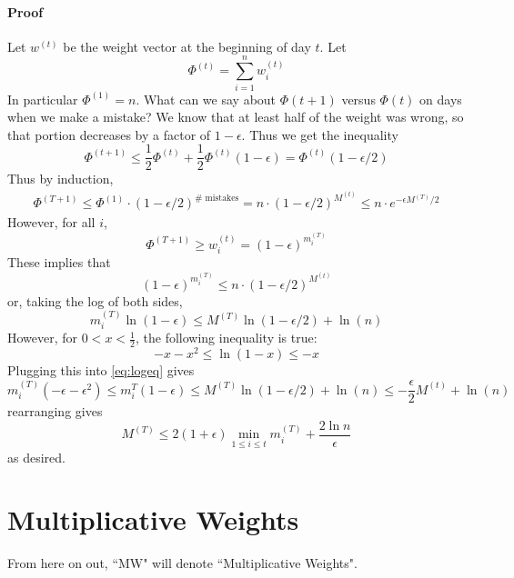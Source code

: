 \documentclass[11pt]{article}
\begin{document}
\paragraph{Proof} Let $w^{(t)}$ be the weight vector at the beginning of day $t$. Let 
\begin{equation}
\Phi^{(t)} = \sum_{i=1}^n w_i^{(t)}
\end{equation}
In particular $\Phi^{(1)} = n$. What can we say about $\Phi(t+1)$ versus $\Phi(t)$ on days when we make a mistake? We know that at least half of the weight was wrong, so that portion decreases by a factor of $1-\epsilon$. Thus we get the inequality
\begin{equation}
\Phi^{(t+1)}\le \frac{1}{2}\Phi^{(t)} + \frac{1}{2}\Phi^{(t)}(1-\epsilon) = \Phi^{(t)}(1 - \epsilon / 2)
\end{equation}
Thus by induction, 
\begin{align}
\Phi^{(T+1)}\le \Phi^{(1)} \cdot (1-\epsilon/2)^{\#\text{ mistakes}} = n \cdot (1 - \epsilon/2)^{M^{(t)}}\le n\cdot e^{-\epsilon M^{(T)}/2}
\end{align}
However, for all $i$, 
\begin{equation}
\Phi^{(T+1)}\ge w_i^{(t)} = (1-\epsilon)^{m_i^{(T)}}
\end{equation}
These implies that
\begin{equation}
(1-\epsilon)^{m_i^{(T)}}\le n \cdot (1 - \epsilon/2)^{M^{(t)}}
\end{equation}
or, taking the log of both sides, 
\begin{equation}
m_i^{(T)} \ln (1-\epsilon) \le M^{(T)}\ln (1-\epsilon/2) + \ln(n)\label{eq:logeq}
\end{equation}
However, for $0 < x < \frac{1}{2}$, the following inequality is true:
\begin{equation}
-x-x^2\le \ln(1-x) \le -x
\end{equation}
Plugging this into \eqref{eq:logeq} gives
\begin{equation}
m_i^{(T)}(-\epsilon - \epsilon^2)\le m_i^{T}(1-\epsilon)\le M^{(T)}\ln (1-\epsilon/2) + \ln(n)\le  -\frac{\epsilon}{2} M^{(t)} + \ln(n)
\end{equation}
rearranging gives
\begin{equation}
M^{(T)}\le 2(1+\epsilon)\displaystyle\min_{1\le i\le t} m_i^{(T)} + \dfrac{2\ln n}{\epsilon}
\end{equation}
as desired.
\section{Multiplicative Weights}
From here on out, ``MW" will denote ``Multiplicative Weights".
\end{document}
